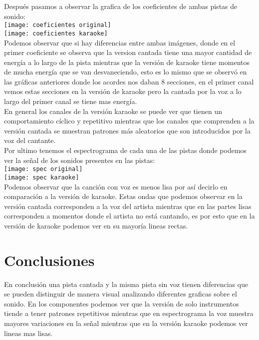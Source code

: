 \documentclass{article}
\begin{document}
	Después pasamos a observar la grafica de los coeficientes de ambas pistas de sonido:\\
	
	\texttt{[image: coeficientes original]} \\
	\texttt{[image: coeficientes karaoke]} \\
	
	Podemos observar que si hay diferencias entre ambas imágenes, donde en el primer coeficiente se observa que la version cantada tiene una mayor cantidad de energía a lo largo de la pista mientras que la versión de karaoke tiene momentos de mucha energía que se van desvaneciendo, esto es lo mismo que se observó en las gráficas anteriores donde los acordes nos daban 8 secciones, en el primer canal vemos estas secciones en la versión de karaoke pero la cantada por la voz a lo largo del primer canal se tiene mas energía.\\
	
	En general los canales de la versión karaoke se puede ver que tienen un comportamiento cíclico y repetitivo mientras que los canales que comprenden a la versión cantada se muestran patrones más aleatorios que son introducidos por la voz del cantante. \\
	
	Por ultimo tenemos el espectrograma de cada una de las pistas donde podemos ver la señal de los sonidos presentes en las pistas: \\
	
	\texttt{[image: spec original]} \\
	\texttt{[image: spec karaoke]} \\
	
	Podemos observar que la canción con voz es menos lisa por así decirlo en comparación a la versión de karaoke. Estas ondas que podemos observar en la versión cantada corresponden a la voz del artista mientras que en las partes lisas corresponden a momentos donde el artista no está cantando, es por esto que en la versión de karaoke podemos ver en su mayoría lineas rectas.\\
	
	\section*{Conclusiones}
	
	En conclusión una pista cantada y la misma pista sin voz tienen diferencias que se pueden distinguir de manera visual analizando diferentes graficas sobre el sonido. En los componentes podemos ver que la versión de solo instrumentos tiende a tener patrones repetitivos mientras que en espectrograma la voz muestra mayores variaciones en la señal mientras que en la versión karaoke podemos ver lineas mas lisas. \\
	
\end{document}
